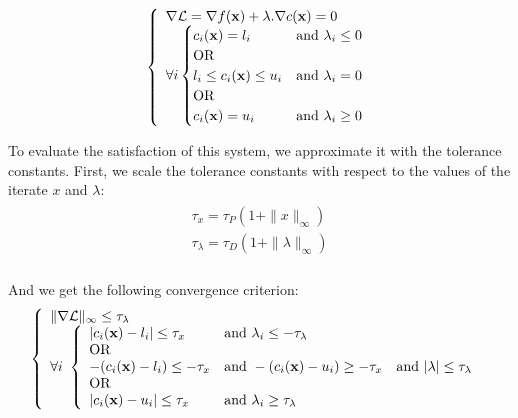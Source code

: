 \begin{equation}
\label{KKTmodified}
\left\{
\begin{array}{lr}
  \nabla \mathcal{L} = \nabla f({\bf x}) + \lambda.\nabla c({\bf x}) = 0 \\
  \forall i
  \begin{cases}
  c_i({\bf x}) = l_i & \text{and } \lambda_i \leq 0 \\
  \text{OR}\\
  l_i \leq c_i({\bf x}) \leq u_i & \text{and } \lambda_i = 0 \\
  \text{OR}\\
  c_i({\bf x}) = u_i & \text{and } \lambda_i \geq 0
  \end{cases}
\end{array}
\right.
\end{equation}

To evaluate the satisfaction of this system, we approximate it with the tolerance constants.
First, we scale the tolerance constants with respect to the values of the iterate $x$ and $\lambda$:
\begin{align}
\begin{split}
  \tau_x = \tau_P(1+\|x\|_\infty)\\
  \tau_\lambda =\tau_D(1+\|\lambda\|_\infty)\\
\end{split}
\end{align}

And we get the following convergence criterion:
\begin{equation}
\label{KKTfinal}
\left\{
\begin{array}{lr}
  \|\nabla \mathcal{L}\|_\infty \leq \tau_\lambda \\
  \forall i\
  \left\{
  \begin{array}{lll}
  |c_i({\bf x}) - l_i| \leq \tau_x & \text{and } \lambda_i \leq -\tau_\lambda\\
  \text{OR}\\
  -(c_i({\bf x}) - l_i) \leq -\tau_x &\text{and } -(c_i({\bf x}) - u_i) \geq -\tau_x & \text{and } |\lambda| \leq \tau_\lambda \\
  \text{OR}\\
  |c_i({\bf x}) - u_i| \leq \tau_x & \text{and } \lambda_i \geq \tau_\lambda\\
  \end{array}
  \right.
\end{array}
\right.
\end{equation}

